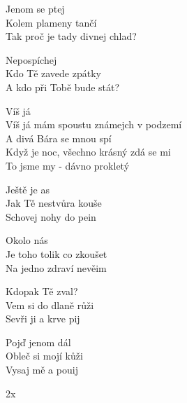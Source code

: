 
\ve{}
Jenom se ptej\\
Kolem plameny tančí\\
Tak proč je tady divnej chlad?

Nepospíchej\\
Kdo Tě zavede zpátky\\
A kdo při Tobě bude stát?

\cho{}
Víš já\\
Víš já mám spoustu známejch v podzemí\\
A divá Bára se mnou spí\\
Když je noc, všechno krásný zdá se mi\\
To jsme my - dávno prokletý 
 
\ve{}
Ještě je as\\
Jak Tě nestvůra kouše\\
Schovej nohy do pein

Okolo nás\\
Je toho tolik co zkoušet\\
Na jedno zdraví nevěim

\cho{}

Kdopak Tě zval?\\
Vem si do dlaně růži\\
Sevři ji a krve pij

Pojď jenom dál\\
Obleč si mojí kůži\\
Vysaj mě a pouij

\cho{}
2x
\esong{}